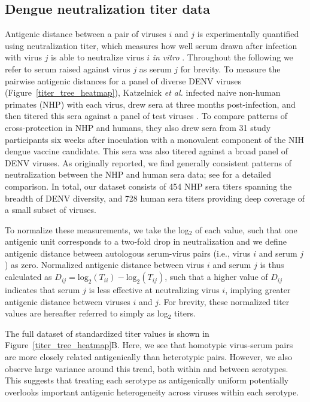 \documentclass[11pt,oneside,letterpaper]{article}
\begin{document}
\subsection*{Dengue neutralization titer data}

Antigenic distance between a pair of viruses $i$ and $j$ is experimentally quantified using neutralization titer, which measures how well serum drawn after infection with virus $j$ is able to neutralize virus $i$ \textit{in vitro} \citep{russell1967dengue}.
Throughout the following we refer to serum raised against virus $j$ as serum $j$ for brevity.
To measure the pairwise antigenic distances for a panel of diverse DENV viruses (Figure~\ref{titer_tree_heatmap}), Katzelnick \textit{et al.} infected naive non-human primates (NHP) with each virus, drew sera at three months post-infection, and then titered this sera against a panel of test viruses \citep{katzelnick2015dengue}.
To compare patterns of cross-protection in NHP and humans, they also drew sera from 31 study participants six weeks after inoculation with a monovalent component of the NIH dengue vaccine candidate.
This sera was also titered against a broad panel of DENV viruses.
As originally reported, we find generally consistent patterns of neutralization between the NHP and human sera data; see \citet{katzelnick2015dengue} for a detailed comparison.
In total, our dataset consists of 454 NHP sera titers spanning the breadth of DENV diversity, and 728 human sera titers providing deep coverage of a small subset of viruses.

To normalize these measurements, we take the log$_2$ of each value, such that one antigenic unit corresponds to a two-fold drop in neutralization and we define antigenic distance between autologous serum-virus pairs (i.e., virus $i$ and serum $j$) as zero.
Normalized antigenic distance between virus $i$ and serum $j$ is thus calculated as $D_{ij} = \mathrm{log}_2(T_{ii}) - \mathrm{log}_2(T_{ij})$, such that a higher value of $D_{ij}$ indicates that serum $j$ is less effective at neutralizing virus $i$, implying greater antigenic distance between viruses $i$ and $j$.
For brevity, these normalized titer values are hereafter referred to simply as log$_2$ titers.

The full dataset of standardized titer values is shown in Figure~\ref{titer_tree_heatmap}B.
Here, we see that homotypic virus-serum pairs are more closely related antigenically than heterotypic pairs.
However, we also observe large variance around this trend, both within and between serotypes.
This suggests that treating each serotype as antigenically uniform potentially overlooks important antigenic heterogeneity across viruses within each serotype.
\end{document}
